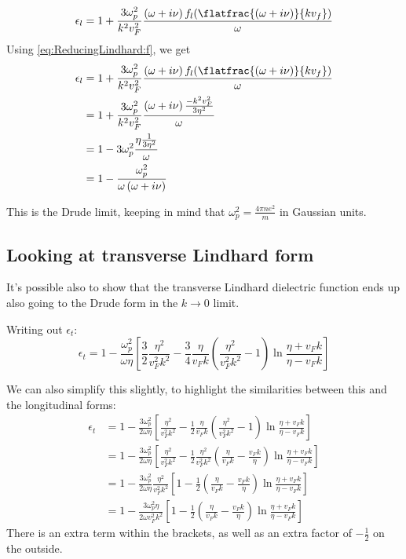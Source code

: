 \documentclass[../../main.tex]{subfiles}
\newcommand{\vf}{v_F}
\begin{document}
\begin{equation}
	 \epsilon_l = 1 + \frac{3 \omega_p^2}{k^2 v_F^2} \frac{\left(\omega + i \nu \right) f_l(\flatfrac{(\omega + i \nu)}{k v_f})}{\omega}
\end{equation}
Using \eqref{eq:ReducingLindhard:f}, we get
\begin{align}
	\epsilon_l &= 1 + \frac{3 \omega_p^2}{k^2 v_F^2} \frac{\left(\omega + i \nu \right) f_l(\flatfrac{(\omega + i \nu)}{k v_f})}{\omega} \\
	&= 1 + \frac{3 \omega_p^2}{k^2 v_F^2} \frac{\left(\omega + i \nu \right) \frac{-k^2 \vf^2}{3 \eta^2}}{\omega} \\
	&= 1 - 3 \omega_p^2 \frac{\eta \frac{1}{ 3\eta^2}}{\omega} \\
	&= 1 - \frac{ \omega_p^2}{\omega \left( \omega + i \nu \right)}
\end{align}

This is the Drude limit, keeping in mind that $\omega_p^2 = \frac{4\pi n e^2}{m}$ in Gaussian units.

\subsection{Looking at transverse Lindhard form}
It's possible also to show that the transverse Lindhard dielectric function ends up also going to the Drude form in the $k \rightarrow 0$ limit. 

Writing out $\epsilon_t$:
\begin{equation} 
	\epsilon_t = 1 - \frac{\omega_p^2}{\omega \eta} \left[\frac32 \frac{\eta^2}{\vf^2 k^2} - \frac34 \frac{\eta}{\vf k} \left(\frac{\eta^2}{\vf^2 k^2} - 1 \right)\ln\frac{\eta + \vf k}{\eta - \vf k} \right]
\end{equation}

We can also simplify this slightly, to highlight the similarities between this and the longitudinal forms:
\begin{align}
	\epsilon_t &= 1 - \frac{3 \omega_p^2}{2\omega \eta} \left[ \frac{\eta^2}{\vf^2 k^2} - \frac12 \frac{\eta}{\vf k} \left(\frac{\eta^2}{\vf^2 k^2} - 1 \right)\ln\frac{\eta + \vf k}{\eta - \vf k} \right] \\
	&= 1 - \frac{3 \omega_p^2}{2\omega \eta} \left[ \frac{\eta^2}{\vf^2 k^2} - \frac12 \frac{\eta^2}{\vf^2 k^2} \left(\frac{\eta}{\vf k} - \frac{\vf k}{\eta} \right)\ln\frac{\eta + \vf k}{\eta - \vf k} \right] \\
	&= 1 - \frac{3 \omega_p^2}{2\omega \eta} \frac{\eta^2}{\vf^2 k^2} \left[ 1 - \frac12 \left(\frac{\eta}{\vf k} - \frac{\vf k}{\eta} \right)\ln\frac{\eta + \vf k}{\eta - \vf k} \right] \\
	&= 1 - \frac{3 \omega_p^2 \eta}{2\omega \vf^2 k^2} \left[ 1 - \frac12 \left(\frac{\eta}{\vf k} - \frac{\vf k}{\eta} \right)\ln\frac{\eta + \vf k}{\eta - \vf k} \right]\label{eq:ReducingLindhard:et}
\end{align}
There is an extra term within the brackets, as well as an extra factor of $-\frac12$ on the outside.
\end{document}

